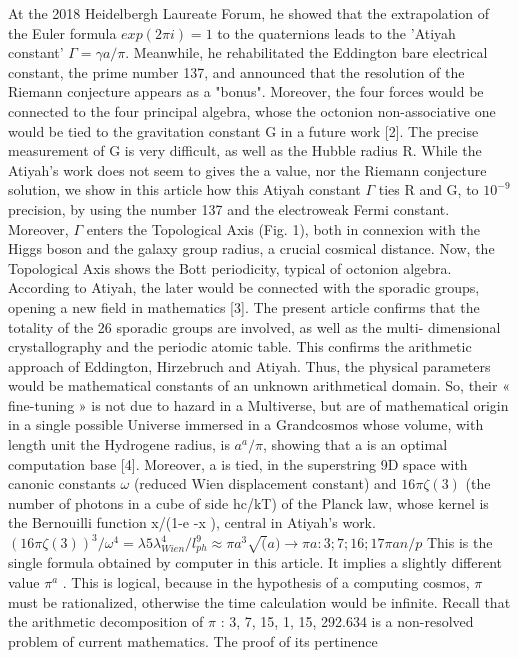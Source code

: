 \documentclass[a4paper,9pt]{article}
\begin{document}
At the 2018 Heidelbergh Laureate Forum,
he showed that the extrapolation of the Euler formula $exp(2\pi i) = 1$ to the quaternions leads to the
'Atiyah constant' $\Gamma = \gamma a/\pi$. Meanwhile, he rehabilitated the Eddington bare electrical constant, the
prime number 137, and announced that the resolution of the Riemann conjecture appears as a
"bonus". Moreover, the four forces would be connected to the four principal algebra, whose the
octonion non-associative one would be tied to the gravitation constant G in a future work [2].
The precise measurement of G is very difficult, as well as the Hubble radius R. While the Atiyah's
work does not seem to gives the a value, nor the Riemann conjecture solution, we show in this
article how this Atiyah constant $\Gamma$ ties R and G, to $10^{-9}$ precision, by using the number 137 and the
electroweak Fermi constant. Moreover, $\Gamma$ enters the Topological Axis (Fig. 1), both in connexion
with the Higgs boson and the galaxy group radius, a crucial cosmical distance. Now, the
Topological Axis shows the Bott periodicity, typical of octonion algebra. According to Atiyah, the
later would be connected with the sporadic groups, opening a new field in mathematics [3]. The
present article confirms that the totality of the 26 sporadic groups are involved, as well as the multi-
dimensional crystallography and the periodic atomic table. This confirms the arithmetic approach of
Eddington, Hirzebruch and Atiyah.
Thus, the physical parameters would be mathematical constants of an unknown arithmetical
domain. So, their « fine-tuning » is not due to hazard in a Multiverse, but are of mathematical origin
in a single possible Universe immersed in a Grandcosmos whose volume, with length unit the
Hydrogene radius, is $a^a /\pi$, showing that a is an optimal computation base [4]. Moreover, a is tied, in
the superstring 9D space with canonic constants $\omega$ (reduced Wien displacement constant) and
$16\pi \zeta(3)$ (the number of photons in a cube of side hc/kT) of the Planck law, whose kernel is the
Bernouilli function x/(1-e -x ), central in Atiyah's work.
$(16\pi \zeta(3))^3 /\omega^4 = \lambda 5 \lambda_{Wien}^4 /l_{ph}^9 \approx \pi a^3 \sqrt(a) \rightarrow \pi a : 3;7;16;17\pi a n/p$
This is the single formula obtained by computer in this article. It implies a slightly different value
$\pi^a$ . This is logical, because in the hypothesis of a computing cosmos, $\pi$ must be rationalized,
otherwise the time calculation would be infinite. Recall that the arithmetic decomposition of $\pi$ : 3,
7, 15, 1, 15, 292.634 is a non-resolved problem of current mathematics. The proof of its pertinence
\end{document}
